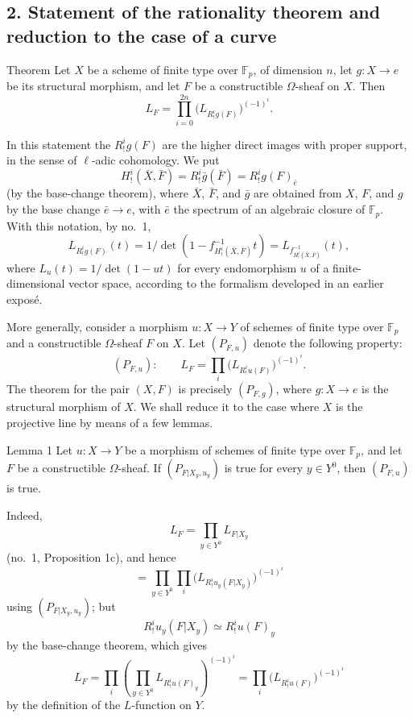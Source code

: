 \subsection*{2. Statement of the rationality theorem and reduction to the case of a curve}

\begin{statement}{Theorem}
Let $X$ be a scheme of finite type over $\mathbb F_p$, of dimension $n$, let $g:X\to e$ be its structural morphism, and let $F$ be a constructible $\Omega$-sheaf on $X$. Then
\[
L_F=\prod_{i=0}^{2n}\bigl(L_{R^i_!g(F)}\bigr)^{(-1)^i}.
\tag{1}
\]
\end{statement}

In this statement the $R^i_!g(F)$ are the higher direct images with proper support, in the sense of $\ell$-adic cohomology. We put
\[
H^i_!(\bar X,\bar F)=R^i_!\bar g(\bar F)=R^i_!g(F)_{\bar e}
\]
(by the base-change theorem), where $\bar X$, $\bar F$, and $\bar g$ are obtained from $X$, $F$, and $g$ by the base change $\bar e\to e$, with $\bar e$ the spectrum of an algebraic closure of $\mathbb F_p$. With this notation, by no.~1,
\[
L_{R^i_!g(F)}(t)=1/\det(1-f^{-1}_{H^i_!(\bar X,\bar F)}t)
 =L_{f^{-1}_{H^i_!(\bar X,\bar F)}}(t),
\]
where $L_u(t)=1/\det(1-ut)$ for every endomorphism $u$ of a finite-dimensional vector space, according to the formalism developed in an earlier exposé.

More generally, consider a morphism $u:X\to Y$ of schemes of finite type over $\mathbb F_p$ and a constructible $\Omega$-sheaf $F$ on $X$. Let $(P_{F,u})$ denote the following property:
\[
(P_{F,u}):\qquad
L_F=\prod_i\bigl(L_{R^i_!u(F)}\bigr)^{(-1)^i}.
\]
The theorem for the pair $(X,F)$ is precisely $(P_{F,g})$, where $g:X\to e$ is the structural morphism of $X$. We shall reduce it to the case where $X$ is the projective line by means of a few lemmas.

\begin{statement}{Lemma 1}
Let $u:X\to Y$ be a morphism of schemes of finite type over $\mathbb F_p$, and let $F$ be a constructible $\Omega$-sheaf. If $(P_{F|X_y,u_y})$ is true for every $y\in Y^0$, then $(P_{F,u})$ is true.
\end{statement}

Indeed,
\[
L_F=\prod_{y\in Y^0}L_{F|X_y}
\]
(no.~1, Proposition 1c), and hence
\[
=\prod_{y\in Y^0}\prod_i\bigl(L_{R^i_!u_y(F|X_y)}\bigr)^{(-1)^i}
\]
using $(P_{F|X_y,u_y})$; but
\[
R^i_!u_y(F|X_y)\simeq R^i_!u(F)_y
\]
by the base-change theorem, which gives
\[
L_F=\prod_i\left(\prod_{y\in Y^0}L_{R^i_!u(F)_y}\right)^{(-1)^i}
=\prod_i\bigl(L_{R^i_!u(F)}\bigr)^{(-1)^i}
\]
by the definition of the $L$-function on $Y$.

